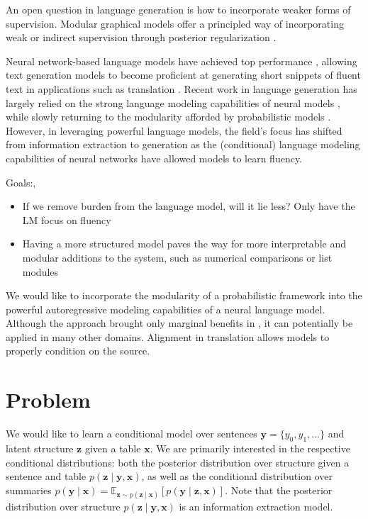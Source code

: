 \documentclass{article}
\newcommand\Es[2]{\mathbb{E}_{#1}\left[#2\right]}
\newcommand{\bx}{\mathbf{x}}
\newcommand{\by}{\mathbf{y}}
\newcommand{\bz}{\mathbf{z}}
\begin{document}
An open question in language generation is how to incorporate weaker forms of supervision.
Modular graphical models offer a principled way of incorporating weak or indirect supervision
through posterior regularization \citep{ganchev2007empc,graca2010pralign,ganchev2010posteriorregularization}.

Neural network-based language models have achieved top performance \citep{yang2017moslm},
allowing text generation models to become proficient at
generating short snippets of fluent text in applications such as translation \citep{bahdanau2014mt}.
Recent work in language generation has largely relied on the strong language modeling capabilities
of neural models \citep{wiseman2017d2t},
while slowly returning to the modularity afforded by probabilistic models \citep{wiseman2018template,deng2018vattn}.
However, in leveraging powerful language models,
the field's focus has shifted from information extraction to generation as the (conditional)
language modeling capabilities of neural networks have allowed models to learn fluency.
\citep{puduppully2018contentselection}

Goals:\citet{wiseman2017d2t}, \citep{liang2009semalign}
\begin{itemize}
\item If we remove burden from the language model, will it lie less?
Only have the LM focus on fluency
\item Having a more structured model paves the way for more interpretable and
modular additions to the system, such as numerical comparisons or list modules
\end{itemize}


We would like to incorporate the modularity of a probabilistic framework into the powerful 
autoregressive modeling capabilities of a neural language model.
Although the approach brought only marginal benefits in \citet{deng2018vattn},
it can potentially be applied in many other domains. 
Alignment in translation allows models to properly condition on the source.


\section{Problem}
We would like to learn a conditional model
over sentences $\by = \{y_0, y_1, \ldots\}$ and latent structure $\bz$ given a table $\bx$.
We are primarily interested in the respective conditional distributions:
both the posterior distribution over structure given a sentence and table $p(\bz\mid\by,\bx)$,
as well as the conditional distribution over summaries
$p(\by\mid\bx)=\Es{\bz\sim p(\bz\mid\bx)}{p(\by\mid\bz,\bx)}$.
Note that the posterior distribution over structure $p(\bz\mid\by,\bx)$
is an information extraction model.
\end{document}

